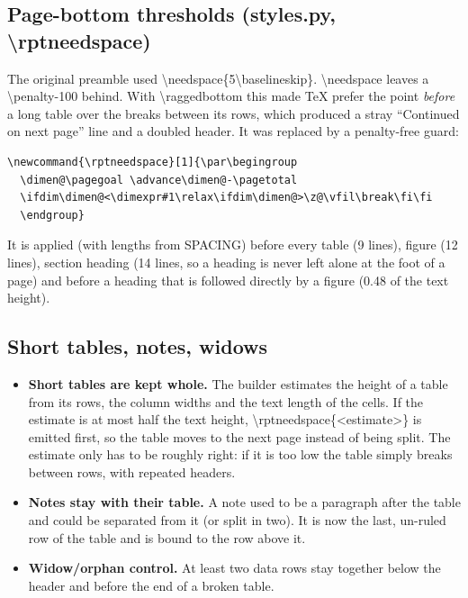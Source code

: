 \documentclass[10pt,a4paper]{article}
\newcommand{\file}[1]{{\footnotesize\ttfamily #1}}
\newcommand{\code}[1]{{\small\ttfamily #1}}
\newenvironment{codeblock}{\par\small\begingroup}{\endgroup\par}
\begin{document}
\subsection{Page-bottom thresholds (\file{styles.py}, \code{\textbackslash rptneedspace})}

The original preamble used \code{\textbackslash needspace\{5\textbackslash baselineskip\}}. \code{\textbackslash needspace} leaves a \code{\textbackslash penalty-100} behind. With \code{\textbackslash raggedbottom} this made TeX prefer the point \emph{before} a long table over the breaks between its rows, which produced a stray ``Continued on next page'' line and a doubled header. It was replaced by a penalty-free guard:

\begin{codeblock}
\begin{verbatim}
\newcommand{\rptneedspace}[1]{\par\begingroup
  \dimen@\pagegoal \advance\dimen@-\pagetotal
  \ifdim\dimen@<\dimexpr#1\relax\ifdim\dimen@>\z@\vfil\break\fi\fi
  \endgroup}
\end{verbatim}
\end{codeblock}

It is applied (with lengths from \code{SPACING}) before every table (9 lines), figure (12 lines), section heading (14 lines, so a heading is never left alone at the foot of a page) and before a heading that is followed directly by a figure (0.48 of the text height).

\subsection{Short tables, notes, widows}

\begin{itemize}
\item \textbf{Short tables are kept whole.} The builder estimates the height of a table from its rows, the column widths and the text length of the cells. If the estimate is at most half the text height, \code{\textbackslash rptneedspace\{<estimate>\}} is emitted first, so the table moves to the next page instead of being split. The estimate only has to be roughly right: if it is too low the table simply breaks between rows, with repeated headers.
\item \textbf{Notes stay with their table.} A note used to be a paragraph after the table and could be separated from it (or split in two). It is now the last, un-ruled row of the table and is bound to the row above it.
\item \textbf{Widow/orphan control.} At least two data rows stay together below the header and before the end of a broken table.
\end{itemize}
\end{document}
